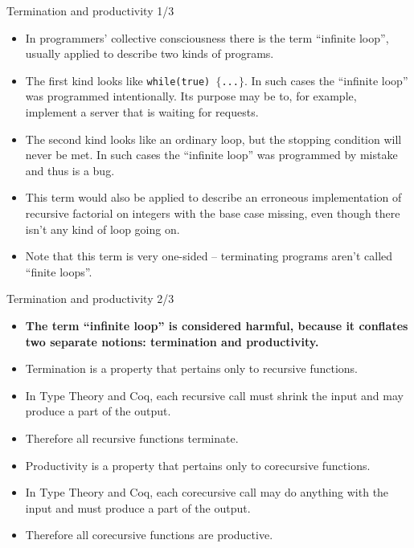 \documentclass{beamer}
\begin{document}
\begin{frame}{Termination and productivity 1/3}
\begin{itemize}
	\item In programmers' collective consciousness there is the term ``infinite loop'', usually applied to describe two kinds of programs.
	\item The first kind looks like \texttt{while(true) $\lbrace$...$\rbrace$}. In such cases the ``infinite loop'' was programmed intentionally. Its purpose may be to, for example, implement a server that is waiting for requests.
	\item The second kind looks like an ordinary loop, but the stopping condition will never be met. In such cases the ``infinite loop'' was programmed by mistake and thus is a bug.
	\item This term would also be applied to describe an erroneous implementation of recursive factorial on integers with the base case missing, even though there isn't any kind of loop going on.
	\item Note that this term is very one-sided -- terminating programs aren't called ``finite loops''.
\end{itemize}
\end{frame}

\begin{frame}{Termination and productivity 2/3}
\begin{itemize}
	\item \textbf{The term ``infinite loop'' is considered harmful, because it conflates two separate notions: termination and productivity.}
	\item Termination is a property that pertains only to recursive functions.
	\item In Type Theory and Coq, each recursive call must shrink the input and may produce a part of the output.
	\item Therefore all recursive functions terminate.
	\item Productivity is a property that pertains only to corecursive functions.
	\item In Type Theory and Coq, each corecursive call may do anything with the input and must produce a part of the output.
	\item Therefore all corecursive functions are productive.
\end{itemize}
\end{frame}
\end{document}
